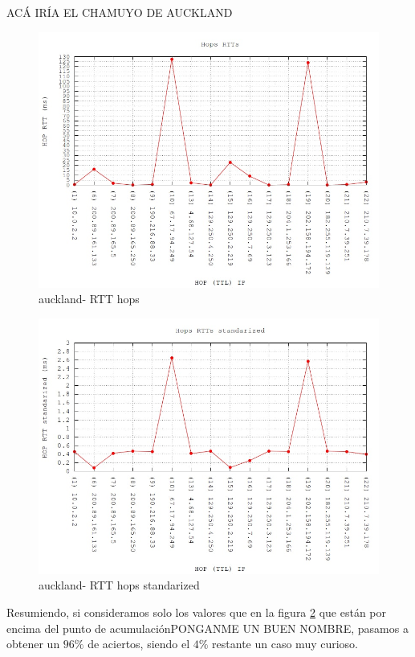ACÁ IRÍA EL CHAMUYO DE AUCKLAND

\begin{figure}[!htbp]
  \centering
    \includegraphics[scale=0.6]{imagenes/auckland-graficos/traceroute-auckland.jpg}
  \caption{auckland- RTT hops}
  \label{fig:7}
\end{figure}

\begin{figure}[!htbp]
  \centering
    \includegraphics[scale=0.6]{imagenes/auckland-graficos/traceroute-auckland-standarized.jpg}
  \caption{auckland- RTT hops standarized}
  \label{fig:8}
\end{figure}


Resumiendo, si consideramos solo los valores que en la figura \ref{fig:8} que están por encima del punto de acumulaciónPONGANME UN BUEN NOMBRE, pasamos a obtener un $96\%$ de aciertos, siendo el $4\%$ restante un caso muy curioso.

